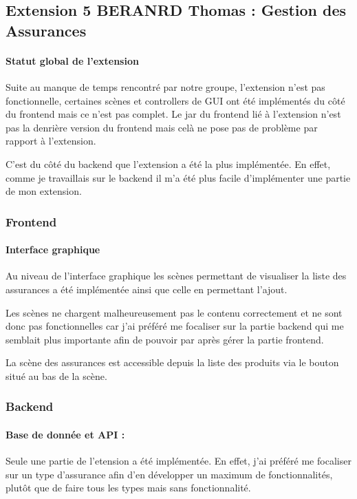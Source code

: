 \documentclass[../rapport.tex]{subfiles}
\begin{document}
	\subsection{Extension 5 BERANRD Thomas : Gestion des Assurances}
		
		\paragraph{Statut global de l'extension}
			Suite au manque de temps rencontré par notre groupe, l'extension n'est pas
			fonctionnelle, certaines scènes et controllers de GUI ont été implémentés du côté
			du frontend mais ce n'est pas complet. Le jar du frontend lié à l'extension n'est
			pas la denrière version du frontend mais celà ne pose pas de problème par rapport
			à l'extension.

			\medskip

			C'est du côté du backend que l'extension a été la plus implémentée. En effet,
			comme je travaillais sur le backend il m'a été plus facile d'implémenter 
			une partie de mon extension.

		\subsubsection{Frontend}
			
			\paragraph{Interface graphique}
			Au niveau de l'interface graphique les scènes permettant de visualiser la 
			liste des assurances a été implémentée ainsi que celle en permettant l'ajout.
			
			\medskip

			Les scènes ne chargent malheureusement pas le contenu correctement et ne sont donc
			pas fonctionnelles car j'ai préféré me focaliser sur la partie backend qui me 
			semblait plus importante afin de pouvoir par après gérer la partie frontend.
			
			\medskip

			La scène des assurances est accessible depuis la liste des produits via le bouton
			situé au bas de la scène.

		
		\subsubsection{Backend}

			\paragraph{Base de donnée et API :}
			Seule une partie de l'etension a été implémentée. En effet, j'ai préféré me focaliser
			sur un type d'assurance afin d'en développer un maximum de fonctionnalités, plutôt
			que de faire tous les types mais sans fonctionnalité.
\end{document}
